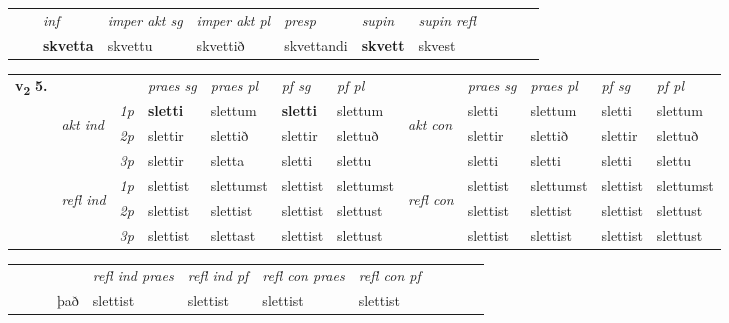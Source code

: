\begin{tabular}{llllllllllll}
 & & \textit{inf} & \textit{imper akt sg} & \textit{imper akt pl}   & \textit{presp} & \textit{supin} & \textit{supin refl}      \\*
  & & \textbf{skvetta} & skvettu  & skvettið   & skvettandi &  \textbf{skvett} & skvest  \\*
\cmidrule{1-12}
\end{tabular}



\begin{tabular}{llllllllllll} \toprule
\multirow{4}{*}{{{\textbf{v{\textsubscript{2}}} \Large{\textbf{5.}}}}}  & &   &  \textit{praes sg}  & \textit{praes pl}  &\textit{ pf sg} & \textit{pf pl} &  &  \textit{praes sg}  & \textit{praes pl}  & \textit{pf sg} & \textit{pf pl } \\*
	\cmidrule{4-7} \cmidrule{9-12}
 & \multirow{3}{*}{\begin{turn}{90}\textit{akt ind}\end{turn}} & {\textit{1p}} & \textbf{sletti} & slettum    & \textbf{sletti} & slettum & \multirow{3}{*}{\begin{turn}{90}\textit{akt con}\end{turn}} &sletti & slettum & sletti & slettum\\*
& &  {\textit{2p}} &  slettir  & slettið   & slettir & slettuð & & slettir & slettið & slettir & slettuð \\*
& &  {\textit{3p}} & slettir & sletta   & sletti & slettu & & sletti & sletti& sletti & slettu  \\*
\cmidrule{4-7} \cmidrule{9-12}
 &\multirow{3}{*}{\begin{turn}{90}\textit{refl ind}\end{turn}} & {\textit{1p}} & slettist & slettumst    & slettist & slettumst & \multirow{3}{*}{\begin{turn}{90}\textit{refl con}\end{turn}}  &slettist & slettumst & slettist & slettumst\\*
 &&  {\textit{2p}} &  slettist  & slettist   & slettist & slettust & &slettist & slettist & slettist & slettust \\*
& &  {\textit{3p}} & slettist & slettast   & slettist & slettust & & slettist & slettist& slettist & slettust  \\*
\cmidrule{4-7} \cmidrule{9-12}
\end{tabular}


\begin{tabular}{llllllllllll}
 & &  & &  \textit{refl ind praes} & \textit{refl ind pf} & \textit{refl con praes} & \textit{refl con pf} \\*
 & &  & það & slettist & slettist & slettist & slettist \\*
\cmidrule{5-9}
\end{tabular}


